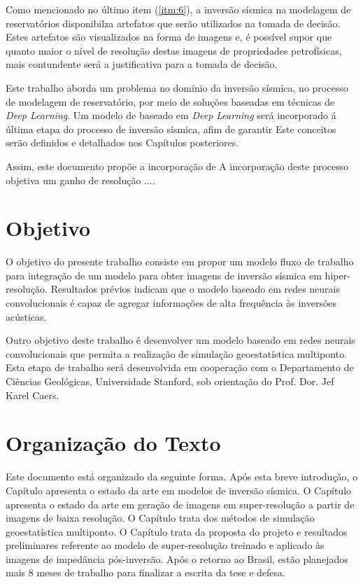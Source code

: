 Como mencionado no último item (\ref{itm:6}), a inversão sísmica na modelagem de reservatórios disponibilza
artefatos que serão utilizados na tomada de decisão. Estes artefatos são visualizados na forma de imagens
e, é possível supor que quanto maior o nível de resolução destas imagens de propriedades petrofísicas,
mais contundente será a justificativa para a tomada de decisão.

Este trabalho aborda um problema no domínio da inversão sísmica,
no processo de modelagem de reservatório, por meio de soluções baseadas em técnicas de \textit{Deep Learning}.
Um modelo de baseado em \textit{Deep Learning} será incorporado á última etapa do processo de inversão sísmica,
afim de garantir 
Este conceitos serão definidos e detalhados nos Capítulos posteriores.

Assim, este documento propõe a incorporação de
A incorporação deste processo objetiva um ganho de resolução ....


\section{Objetivo}

O objetivo do presente trabalho consiste em propor um modelo fluxo de trabalho
para integração de um modelo para obter imagens de inversão sísmica em hiper-resolução.
Resultados prévios indicam que o modelo baseado em redes neurais convolucionais é capaz
de agregar informações de alta frequência às inversões acústicas.

Outro objetivo deste trabalho é desenvolver um modelo baseado em redes neurais convolucionais que permita a
realização de simulação geoestatística multiponto. Esta etapa de trabalho será desenvolvida
em cooperação com o Departamento de Ciências Geológicas, Universidade Stanford, sob
orientação do Prof. Dor. Jef Karel Caers.


\section{Organização do Texto}

Este documento está organizado da seguinte forma. Após esta breve introdução, o
Capítulo %
apresenta o estado da arte em modelos de
inversão sísmica. O Capítulo %
apresenta o estado da arte 
em geração de imagens em super-resolução a partir de imagens de baixa resolução.
O Capítulo trata dos métodos de simulação geoestatística multiponto. O
Capítulo %
trata da proposta do projeto e resultados
preliminares referente ao modelo de super-resolução treinado e aplicado às imagens
de impedância pós-inversão. Após o retorno ao Brasil, estão planejados mais 8 meses
de trabalho para finalizar a escrita da tese e defesa.

